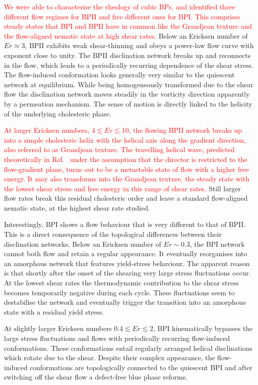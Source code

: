 \documentclass[8.5pt,twoside,twocolumn]{article}
\newcommand{\rev}[1]{{\textcolor{red}{#1}}}
\begin{document}
\rev{
We were able to characterise the rheology of cubic BPs, and identified 
three different flow regimes for BPII and five different ones for BPI.
This comprises steady states that BPI and BPII have in common like the 
Grandjean texture and the flow-aligned nematic state at high shear rates.
}  
Below an Ericksen number of $Er\simeq3$, BPII exhibits weak shear-thinning and 
obeys a power-law flow curve with exponent close to unity.  
The BPII disclination network breaks up and reconnects 
in the flow, which leads to a periodically recurring dependence 
of the shear stress. The flow-induced conformation looks generally
very similar to the quiescent network at equilibrium. 
While being homogeneously transformed due to the shear flow
the disclination network moves steadily in the vorticity direction
apparently by a permeation mechanism. The sense of
motion is directly linked to the helicity of the underlying cholesteric phase.

\rev{
At larger Ericksen numbers, $4\lesssim Er\lesssim 10$, the flowing BPII network 
breaks up into a simple cholesteric helix with the helical axis 
along the gradient direction, also referred to as Grandjean texture. 
The travelling helical wave, predicted theoretically in Ref.~\cite{Rey:1996a,Rey:1996b}
under the assumption that the director is restricted to the flow-gradient plane,
turns out to be a metastable state of flow with a higher free energy.
It may also transforms into the Grandjean texture, the steady state with the lowest
shear stress and free energy in this range of shear rates.
}
Still larger flow rates break this residual
cholesteric order and leave a standard flow-aligned nematic state,
at the highest shear rate studied.

Interestingly, BPI shows a flow behaviour that is very different to that of BPII.
This is a direct consequence of the topological differences between their disclination 
networks. Below an Ericksen number of $Er\sim 0.3$, the BPI network cannot both flow and 
retain a regular appearance. It eventually reorganises into an amorphous network that
features yield-stress behaviour. The apparent reason is that shortly after the onset of the shearing 
very large stress fluctuations occur. At the lowest shear rates
the thermodynamic contribution to the shear stress becomes temporarily 
negative during each cycle. These fluctuations seem to destabilise the network and 
eventually trigger the transition into an amorphous state with a residual yield
stress. 

At slightly larger Ericksen numbers $0.4\lesssim Er \lesssim2$,
BPI kinematically bypasses the large stress fluctuations and 
flows with periodically recurring flow-induced conformations.
These conformations entail regularly arranged helical disclinations which 
rotate due to the shear. 
Despite their complex appearance, the flow-induced conformations are 
topologically connected to the quiescent BPI and after switching off the 
shear flow a defect-free blue phase reforms.
\end{document}
